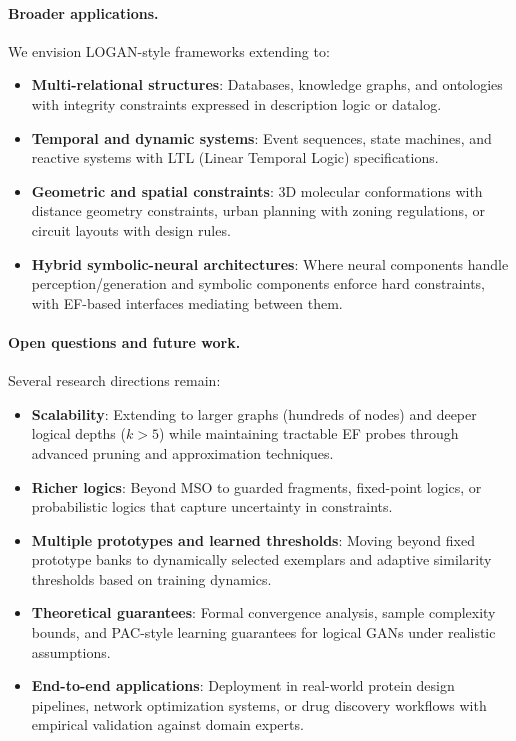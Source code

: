 \documentclass{article}
\begin{document}
\paragraph{Broader applications.}
We envision LOGAN-style frameworks extending to:
\begin{itemize}[noitemsep]
    \item \textbf{Multi-relational structures}: Databases, knowledge graphs, and ontologies with integrity constraints expressed in description logic or datalog.
    \item \textbf{Temporal and dynamic systems}: Event sequences, state machines, and reactive systems with LTL (Linear Temporal Logic) specifications.
    \item \textbf{Geometric and spatial constraints}: 3D molecular conformations with distance geometry constraints, urban planning with zoning regulations, or circuit layouts with design rules.
    \item \textbf{Hybrid symbolic-neural architectures}: Where neural components handle perception/generation and symbolic components enforce hard constraints, with EF-based interfaces mediating between them.
\end{itemize}

\paragraph{Open questions and future work.}
Several research directions remain:
\begin{itemize}[noitemsep]
    \item \textbf{Scalability}: Extending to larger graphs (hundreds of nodes) and deeper logical depths ($k > 5$) while maintaining tractable EF probes through advanced pruning and approximation techniques.
    \item \textbf{Richer logics}: Beyond MSO to guarded fragments, fixed-point logics, or probabilistic logics that capture uncertainty in constraints.
    \item \textbf{Multiple prototypes and learned thresholds}: Moving beyond fixed prototype banks to dynamically selected exemplars and adaptive similarity thresholds based on training dynamics.
    \item \textbf{Theoretical guarantees}: Formal convergence analysis, sample complexity bounds, and PAC-style learning guarantees for logical GANs under realistic assumptions.
    \item \textbf{End-to-end applications}: Deployment in real-world protein design pipelines, network optimization systems, or drug discovery workflows with empirical validation against domain experts.
\end{itemize}
\end{document}
